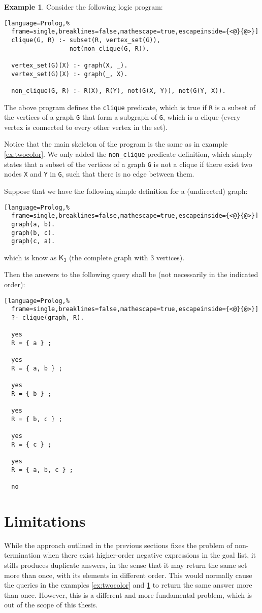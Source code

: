 \documentclass[inscr,ack,preface]{dithesis}
\theoremstyle{definition}
\newtheorem{example}{Example}[chapter]
\newcommand{\msf}[1]{$\mathsf{#1}$}
\begin{document}
\begin{example} \label{ex:clique}
Consider the following logic program:
\begin{lstlisting}[language=Prolog,%
  frame=single,breaklines=false,mathescape=true,escapeinside={<@}{@>}]
  clique(G, R) :- subset(R, vertex_set(G)),
                  not(non_clique(G, R)).

  vertex_set(G)(X) :- graph(X, _).
  vertex_set(G)(X) :- graph(_, X).

  non_clique(G, R) :- R(X), R(Y), not(G(X, Y)), not(G(Y, X)).
\end{lstlisting}
The above program defines the \texttt{clique} predicate, which is true if \texttt{R} is a subset of the vertices of a graph \texttt{G} that form a subgraph of \texttt{G}, which is a clique (every vertex is connected to every other vertex in the set).

Notice that the main skeleton of the program is the same as in example \ref{ex:twocolor}. We only added the \texttt{non\_clique} predicate definition, which simply states that a subset of the vertices of a graph \texttt{G} is not a clique if there exist two nodes \texttt{X} and \texttt{Y} in \texttt{G}, such that there is no edge between them.

Suppose that we have the following simple definition for a (undirected) graph:
\begin{lstlisting}[language=Prolog,%
  frame=single,breaklines=false,mathescape=true,escapeinside={<@}{@>}]
  graph(a, b).
  graph(b, c).
  graph(c, a).
\end{lstlisting}
which is know as \msf{K_3} (the complete graph with 3 vertices).

Then the answers to the following query shall be (not necessarily in the indicated order):
\begin{lstlisting}[language=Prolog,%
  frame=single,breaklines=false,mathescape=true,escapeinside={<@}{@>}]
  ?- clique(graph, R).

  yes
  R = { a } ;

  yes
  R = { a, b } ;

  yes
  R = { b } ;

  yes
  R = { b, c } ;

  yes
  R = { c } ;

  yes
  R = { a, b, c } ;

  no
\end{lstlisting}
\end{example}

\section{Limitations}
\label{section:limitations}
While the approach outlined in the previous sections fixes the problem of non-termination when there exist higher-order negative expressions in the goal list, it stills produces duplicate answers, in the sense that it may return the same set more than once, with its elements in different order. This would normally cause the queries in the examples \ref{ex:twocolor} and \ref{ex:clique} to return the same answer more than once. However, this is a different and more fundamental problem, which is out of the scope of this thesis.
\end{document}
